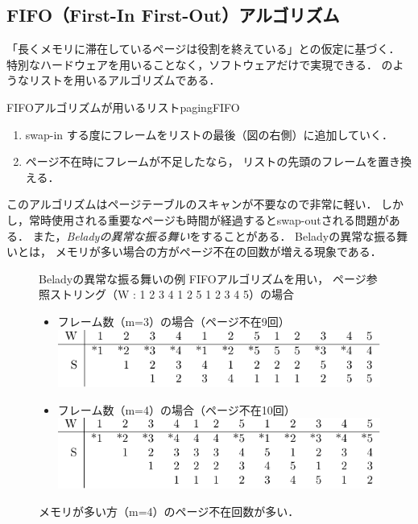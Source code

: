 \subsection{FIFO（First-In First-Out）アルゴリズム}
「長くメモリに滞在しているページは役割を終えている」との仮定に基づく．
特別なハードウェアを用いることなく，ソフトウェアだけで実現できる．
のようなリストを用いるアルゴリズムである．

         {FIFOアルゴリズムが用いるリスト}{pagingFIFO}

\begin{enumerate}
\item swap-in する度にフレームをリストの最後（図の右側）に追加していく．
\item ページ不在時にフレームが不足したなら，
  リストの先頭のフレームを置き換える．
\end{enumerate}

このアルゴリズムはページテーブルのスキャンが不要なので非常に軽い．
しかし，常時使用される重要なページも時間が経過するとswap-outされる問題がある．
また，\emph{Beladyの異常な振る舞い}をすることがある．
Beladyの異常な振る舞いとは，
メモリが多い場合の方がページ不在の回数が増える現象である．

\begin{figure}[btp]
  \begin{itembox}[l]{Beladyの異常な振る舞いの例}
    FIFOアルゴリズムを用い，
    ページ参照ストリング（W : 1 2 3 4 1 2 5 1 2 3 4 5）の場合
    \begin{itemize}
    \item フレーム数（m=3）の場合（ページ不在9回）\\
      \includegraphics[scale=1.0]{Tbl/beladyAnomalyM3.pdf}
    \item フレーム数（m=4）の場合（ページ不在10回）\\
      \includegraphics[scale=1.0]{Tbl/beladyAnomalyM4.pdf}
    \end{itemize}
    メモリが多い方（m=4）のページ不在回数が多い．
  \end{itembox}
\end{figure}

